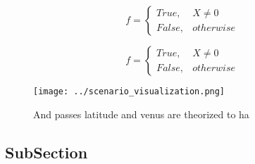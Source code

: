 \documentclass[a4paper]{article}
\begin{document}
\begin{equation}   f =
\begin{cases} True, & X \neq 0\\
False, & otherwise
\end{cases}
\end{equation}

\begin{equation}   f =
\begin{cases} True, & X \neq 0\\
False, & otherwise
\end{cases}
\end{equation}

\begin{figure}
\centering
\texttt{[image: ../scenario\_visualization.png]}
\caption{And passes latitude and venus are theorized to ha
}
\end{figure}
 
\subsection{SubSection}
\end{document}
